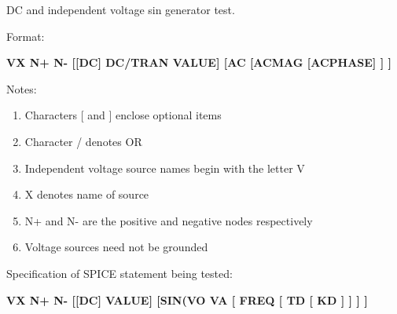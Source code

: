 %
%
%
%

\renewcommand{\thesubfigure}{\thefigure(\alph{subfigure})}
\makeatletter
  \renewcommand{\@thesubfigure}{\thesubfigure:\space}
  \renewcommand{\p@subfigure}{}
\makeatother

\renewcommand{\thesubtable}{\thetable(\alph{subtable})}
\makeatletter
  \renewcommand{\@thesubtable}{\thesubtable:\space}
  \renewcommand{\p@subtable}{}
\makeatother

DC and independent voltage sin generator test.


Format:
\linebreak 
\bigskip 
\begin{footnotesize}\textbf{VX N+ N- [[DC]  DC/TRAN VALUE]  [AC [ACMAG [ACPHASE] ] ]}                                                          \end{footnotesize}
\linebreak 
Notes: 
\begin{enumerate}
 \item Characters [ and ] enclose optional items 
 \item Character / denotes OR
 \item Independent voltage source names begin with the letter V
 \item X denotes name of source
 \item N+ and N- are the positive and negative nodes respectively
 \item Voltage sources need not be grounded
\end{enumerate}

\begin{flushleft}
Specification of SPICE statement being tested:                                              \end{flushleft}


\textbf{VX N+ N- [[DC] VALUE] [SIN(VO VA [ FREQ [ TD [ KD ] ] ] ]}


\bigskip 


